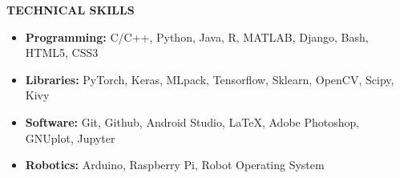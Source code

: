 \documentclass[11pt]{article}%
\begin{document}
\begin{flushleft}
\bf{\LARGE{T}\Large{ECHNICAL} \LARGE{S}\Large{KILLS}}
\hrulefill

\end{flushleft}
\vspace{-7mm}
\begin{itemize}
    \setlength\itemsep{0.01em}
    \item \textbf{Programming:} C/C++, Python, Java, R, MATLAB, Django, Bash, HTML5, CSS3
    \vspace{-1.2mm}
    \item \textbf{Libraries:} PyTorch, Keras, MLpack, Tensorflow, Sklearn, OpenCV, Scipy, Kivy
    \vspace{-1.2mm}
    \item \textbf{Software:}  Git, Github, Android Studio, \LaTeX, Adobe Photoshop, GNUplot, Jupyter
    \vspace{-1.2mm}
    \item \textbf{Robotics:} Arduino, Raspberry Pi, Robot Operating System
\end{itemize}

\vspace{-4mm}
\end{document}
